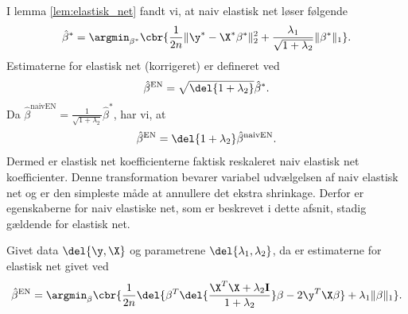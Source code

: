 I lemma \ref{lem:elastisk_net} fandt vi, at naiv elastisk net løser følgende 
\begin{align}
\hat{\beta}^* = \argmin_{\beta^*} \cbr{\frac{1}{2n} \Vert \y^* - \X^* \beta^* \Vert_2^2 + \frac{\lambda_1}{\sqrt{1+\lambda_2}} \Vert \beta^* \Vert_1}. \label{eq:EN8}
\end{align}
Estimaterne for elastisk net (korrigeret) er defineret ved
\begin{align*}
\hat{\beta}^\text{EN} = \sqrt{\del{1+\lambda_2}} \hat{\beta}^*.
\end{align*}
Da \(\hat{\beta}^\text{naivEN} = \frac{1}{\sqrt{1+\lambda_2}} \hat{\beta}^*\), har vi, at
\begin{align*}
\hat{\beta}^\text{EN} = \del{1+\lambda_2} \hat{\beta}^\text{naivEN}.
\end{align*}
Dermed er elastisk net koefficienterne faktisk reskaleret naiv elastisk net koefficienter.
Denne transformation bevarer variabel udvælgelsen af naiv elastisk net og er den simpleste måde at annullere det ekstra shrinkage.
Derfor er egenskaberne for naiv elastiske net, som er beskrevet i dette afsnit, stadig gældende for elastisk net.
%
\begin{thm} \label{thm:elastisk_net2}
Givet data \(\del{\y, \X}\) og parametrene \(\del{\lambda_1, \lambda_2}\), da er estimaterne for elastisk net givet ved
\begin{align}
\hat{\beta}^\text{EN} = \argmin_\beta \cbr{ \frac{1}{2n} \del{\beta^T \del{\frac{\X^T \X + \lambda_2 \mathbf{I}}{1 + \lambda_2}} \beta - 2 \y^T \X \beta} + \lambda_1 \Vert \beta \Vert_1}. \label{eq:EN6}
\end{align}
\end{thm}
